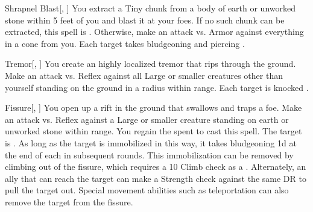 \lowercase{\hypertarget{spell:Shrapnel Blast}{}}\label{spell:Shrapnel Blast}
\begin{apability}[\nth{2}]{\hypertarget{spell:Shrapnel Blast}{Shrapnel Blast}}[, ]
You extract a Tiny chunk from a body of earth or unworked stone within 5 feet of you and blast it at your foes.
If no such chunk can be extracted, this spell is .
Otherwise, make an attack vs. Armor against everything in a \arealarge cone from you.
\hit Each target takes bludgeoning and piercing .
\end{apability}
\vspace{0.25em}



\lowercase{\hypertarget{spell:Tremor}{}}\label{spell:Tremor}
\begin{apability}[\nth{2}]{\hypertarget{spell:Tremor}{Tremor}}[, ]
You create an highly localized tremor that rips through the ground.
Make an attack vs. Reflex against all Large or smaller creatures other than yourself standing on the ground in a \areamed radius within \rngmed range.
\hit Each target is knocked .
\end{apability}
\vspace{0.25em}



\lowercase{\hypertarget{spell:Fissure}{}}\label{spell:Fissure}
\begin{apability}[\nth{3}]{\hypertarget{spell:Fissure}{Fissure}}[, ]
You open up a rift in the ground that swallows and traps a foe.
Make an attack vs. Reflex against a Large or smaller creature standing on earth or unworked stone within \rngmed range.
\miss You regain the  spent to cast this spell.
\hit The target is .
As long as the target is immobilized in this way,
it takes bludgeoning  \minus1d at the end of each  in subsequent rounds.
This immobilization can be removed by climbing out of the fissure, which requires a  10 Climb check as a .
Alternately, an ally that can reach the target can make a Strength check against the same DR to pull the target out.
Special movement abilities such as teleportation can also remove the target from the fissure.
\end{apability}
\vspace{0.25em}



